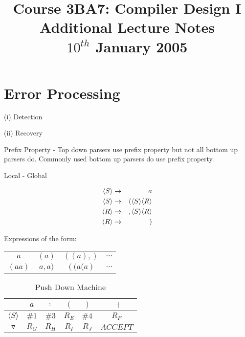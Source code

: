 \documentclass[a4paper,12pt]{article}
\newcommand{\nonterminal}[1]{\langle #1 \rangle}
\begin{document}
\title{Course 3BA7: Compiler Design I \\ Additional Lecture Notes \\	$10^{th}$ January 2005}

\maketitle

\section*{Error Processing}

(i) Detection

(ii) Recovery


Prefix Property - Top down parsers use prefix property but not all 
bottom up parsers do. Commonly used bottom up parsers do use prefix 
property.


Local - Global


\begin{eqnarray}
\setcounter{equation}{1}
\nonterminal{S}	&	\to	&	a													\\
\nonterminal{S}	&	\to	&	( \nonterminal{S} \nonterminal{R}	\\
\nonterminal{R}	&	\to	&	, \nonterminal{S} \nonterminal{R}		\\
\nonterminal{R}	&	\to	&	)
\end{eqnarray}


Expressions of the form:

\begin{tabular}{cccc}
$a$						&	$\left( a \right)$	&	$\left( \left( a \right), \right)$	&	$\cdots$	\\
$\left( a a \right)$	&	$ a , a )$		&	$\left( ( a ( a \right)$	&	$\cdots$	\\
\end{tabular}

\begin{table}[hbtp]

\begin{tabular}{|c|c|c|c|c|c|}
\hline
						&	$a$		&	$,$		&	$($		&	$)$		&	$\dashv$		\\
\hline
$\nonterminal{S}$	&	$\#1$		&	$\#3$		&	$R_{E}$	&	$\#4$		&	$R_{F}$		\\
\hline
$\triangledown$	&	$R_{G}$	&	$R_{H}$	&	$R_{I}$	&	$R_{J}$	&	$ACCEPT$		\\
\hline
\end{tabular}

\caption{Push Down Machine}

\end{table}
\end{document}
